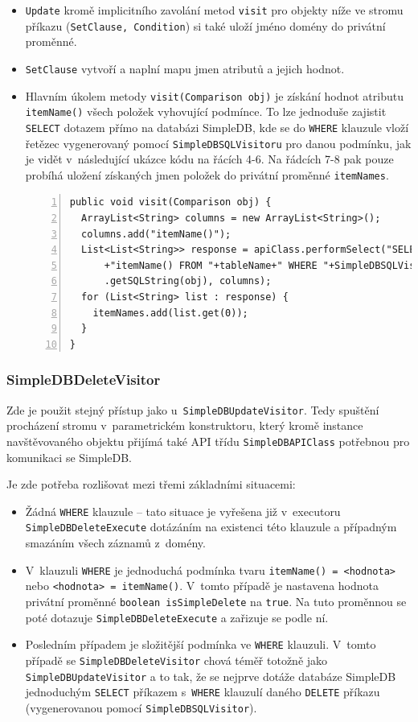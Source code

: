 \documentclass[oneside,12pt,final]{fithesis2}
\begin{document}
\begin{itemize}
 \item \texttt{Update} kromě implicitního zavolání metod \texttt{visit} pro objekty níže ve stromu příkazu (\texttt{SetClause, Condition}) si také uloží jméno domény do privátní proměnné.
 \item \texttt{SetClause} vytvoří a naplní mapu jmen atributů a jejich hodnot.
 \item Hlavním úkolem metody \texttt{visit(Comparison obj)} je získání hodnot atributu \texttt{itemName()} všech položek vyhovující podmínce. To lze jednoduše zajistit \texttt{SELECT} dotazem přímo na databázi SimpleDB, kde se do \texttt{WHERE} klauzule vloží řetězec vygenerovaný pomocí \texttt{SimpleDBSQLVisitoru} pro danou podmínku, jak je vidět v~následující ukázce kódu na řácích 4-6. Na řádcích 7-8 pak pouze probíhá uložení získaných jmen položek do privátní proměnné \texttt{itemNames}.
 \begin{Verbatim}[fontsize=\small,numbers=left]
public void visit(Comparison obj) {
  ArrayList<String> columns = new ArrayList<String>();
  columns.add("itemName()");
  List<List<String>> response = apiClass.performSelect("SELECT "
      +"itemName() FROM "+tableName+" WHERE "+SimpleDBSQLVisitor
      .getSQLString(obj), columns);
  for (List<String> list : response) {
    itemNames.add(list.get(0));
  }
}
 \end{Verbatim}
\end{itemize}

\subsubsection*{SimpleDBDeleteVisitor}
Zde je použit stejný přístup jako u~\texttt{SimpleDBUpdateVisitor}. Tedy spuštění procházení stromu v~parametrickém konstruktoru, který kromě instance navštěvovaného objektu přijímá také API třídu \texttt{SimpleDBAPIClass} potřebnou pro komunikaci se SimpleDB.

Je zde potřeba rozlišovat mezi třemi základními situacemi:
\begin{itemize}
 \item Žádná \texttt{WHERE} klauzule -- tato situace je vyřešena již v~executoru \texttt{SimpleDBDeleteExecute} dotázáním na existenci této klauzule a případným smazáním všech záznamů z~domény.
 \item V~klauzuli \texttt{WHERE} je jednoduchá podmínka tvaru \texttt{itemName() = <hodnota>} nebo \texttt{<hodnota> = itemName()}. V~tomto případě je nastavena hodnota privátní proměnné \texttt{boolean isSimpleDelete} na \texttt{true}. Na tuto proměnnou se poté dotazuje \texttt{SimpleDBDelete\allowbreak Execute} a zařizuje se podle ní.
 \item Posledním případem je složitější podmínka ve \texttt{WHERE} klauzuli. V~tomto případě se \texttt{SimpleDBDeleteVisitor} chová téměř totožně jako \texttt{SimpleDBUpdateVisitor} a to tak, že se nejprve dotáže databáze SimpleDB jednoduchým \texttt{SELECT} příkazem s~\texttt{WHERE} klauzulí daného \texttt{DELETE} příkazu (vygenerovanou pomocí \texttt{SimpleDBSQL\allowbreak Visitor}).
\end{itemize}
\end{document}
